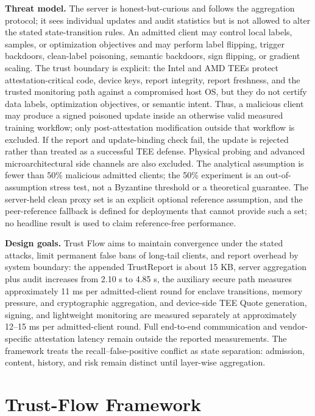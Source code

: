 \documentclass[conference,compsoc]{IEEEtran}
\begin{document}
\textbf{Threat model.} The server is honest-but-curious and follows the aggregation protocol; it sees individual updates and audit statistics but is not allowed to alter the stated state-transition rules. An admitted client may control local labels, samples, or optimization objectives and may perform label flipping, trigger backdoors, clean-label poisoning, semantic backdoors, sign flipping, or gradient scaling. The trust boundary is explicit: the Intel and AMD TEEs protect attestation-critical code, device keys, report integrity, report freshness, and the trusted monitoring path against a compromised host OS, but they do not certify data labels, optimization objectives, or semantic intent. Thus, a malicious client may produce a signed poisoned update inside an otherwise valid measured training workflow; only post-attestation modification outside that workflow is excluded. If the report and update-binding check fail, the update is rejected rather than treated as a successful TEE defense. Physical probing and advanced microarchitectural side channels are also excluded. The analytical assumption is fewer than 50\% malicious admitted clients; the 50\% experiment is an out-of-assumption stress test, not a Byzantine threshold or a theoretical guarantee. The server-held clean proxy set is an explicit optional reference assumption, and the peer-reference fallback is defined for deployments that cannot provide such a set; no headline result is used to claim reference-free performance.

\textbf{Design goals.} Trust Flow aims to maintain convergence under the stated attacks, limit permanent false bans of long-tail clients, and report overhead by system boundary: the appended TrustReport is about 15 KB, server aggregation plus audit increases from 2.10 s to 4.85 s, the auxiliary secure path measures approximately 11 ms per admitted-client round for enclave transitions, memory pressure, and cryptographic aggregation, and device-side TEE Quote generation, signing, and lightweight monitoring are measured separately at approximately 12--15 ms per admitted-client round. Full end-to-end communication and vendor-specific attestation latency remain outside the reported measurements. The framework treats the recall--false-positive conflict as state separation: admission, content, history, and risk remain distinct until layer-wise aggregation.

\section{Trust-Flow Framework}
\end{document}
